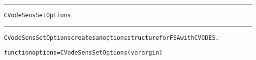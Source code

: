 \begin{samepage}
\hrule
\begin{center}
{\large \verb!CVodeSensSetOptions!}
\label{p:CVodeSensSetOptions}
\end{center}
\hrule\vspace{0.1in}



\begin{alltt}
CVodeSensSetOptions creates an options structure for FSA with CVODES.
\end{alltt}

\end{samepage}



\begin{samepage}


\begin{alltt}
function options = CVodeSensSetOptions(varargin) 
\end{alltt}

\end{samepage}



